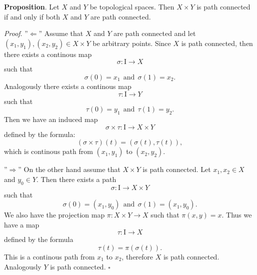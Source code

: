 \documentclass[12pt]{article}
\begin{document}
\textbf{Proposition}. Let $X$ and $Y$ be topological spaces. Then $X\times Y$ is path connected if and only if both $X$ and $Y$ are path connected.

\textit{Proof}. ''$\Leftarrow$'' Assume that $X$ and $Y$ are path connected and let $(x_1,y_1), (x_2,y_2)\in X\times Y$ be arbitrary points. Since $X$ is path connected, then there exists a continous map $$\sigma:\mathrm{I}\to X$$ such that $$\sigma(0)=x_1\ \ \mathrm{and}\ \ \sigma(1)=x_{2}.$$ Analogously there exists a continous map $$\tau:\mathrm{I}\to Y$$ such that $$\tau(0)=y_1\ \ \mathrm{and}\ \ \tau(1)=y_{2}.$$ Then we have an induced map $$\sigma\times\tau:\mathrm{I}\to X\times Y$$ defined by the formula: $$( \sigma\times\tau )(t)=(\sigma(t),\tau(t)),$$
which is continous path from $(x_1,y_1)$ to $(x_2,y_2)$.

''$\Rightarrow$'' On the other hand assume that $X\times Y$ is path connected. Let $x_1,x_2\in X$ and $y_0\in Y$. Then there exists a path $$\sigma:\mathrm{I}\to X\times Y$$
such that $$\sigma(0)=(x_1,y_0)\ \ \mathrm{and}\ \ \sigma(1)=(x_1,y_0).$$ We also have the projection map $\pi: X\times Y\to X$ such that $\pi(x,y)=x$. Thus we have a map $$\tau:\mathrm{I}\to X$$ defined by the formula $$\tau(t)=\pi(\sigma(t)).$$
This is a continous path from $x_1$ to $x_2$, therefore $X$ is path connected. Analogously $Y$ is path connected. $\square$

\end{document}
